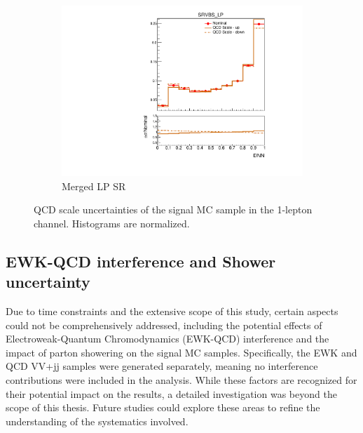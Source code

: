 \begin{figure}[ht]
\begin{subfigure}[b]{0.3\textwidth}
        \includegraphics[width=\textwidth]{figures/1lep/PDFUnc/QCDScale_DNN/EW6lvqq_0ptag1pfat0pjet_0ptv_SRVBS_LP_DNN_SysTheoryQCD_VBS__1up_Norm.pdf}
        \caption{Merged LP SR}
    \end{subfigure}
    \caption{QCD scale uncertainties of the signal MC sample in the 1-lepton channel. Histograms are normalized.}
    \label{fig:ScaleUnc1Lep_sig}
\end{figure}

\clearpage
\subsection{EWK-QCD interference and Shower uncertainty}
\label{subsec:sig_uncer_interf}


Due to time constraints and the extensive scope of this study, certain aspects could not be comprehensively addressed, 
including the potential effects of Electroweak-Quantum Chromodynamics (EWK-QCD) interference and the impact of parton showering on the signal MC samples. 
Specifically, the EWK and QCD VV+jj samples were generated separately, meaning no interference contributions were included in the analysis. 
While these factors are recognized for their potential impact on the results, a detailed investigation was beyond the scope of this thesis. 
Future studies could explore these areas to refine the understanding of the systematics involved.



